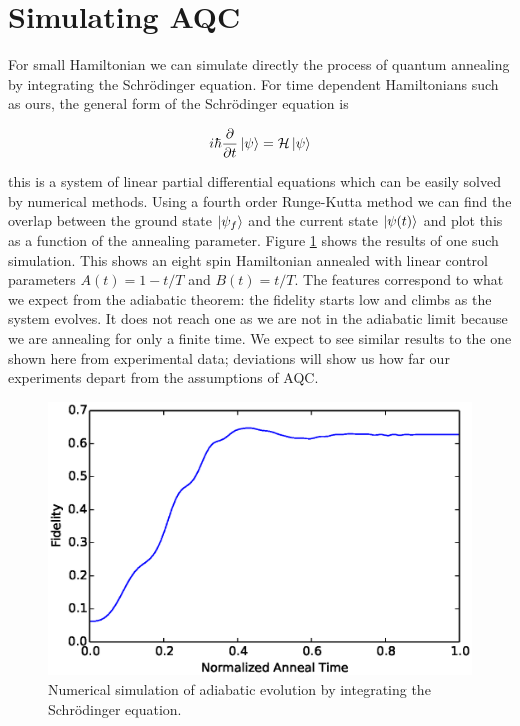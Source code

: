 \section{Simulating AQC}
For small Hamiltonian we can simulate directly the process of quantum annealing by integrating the Schr\"odinger equation. For time dependent Hamiltonians such as ours, the general form of the Schr\"odinger equation is 

\begin{equation}
	i\hbar\frac{\partial}{\partial t} \mathinner{|{\psi}\rangle} = \mathcal{H}\mathinner{|{\psi}\rangle}
\end{equation}

this is a system of linear partial differential equations which can be easily solved by numerical methods.  Using a fourth order Runge-Kutta method\cite{comp_book} we can find the overlap between the ground state $\mathinner{|{\psi_f}\rangle}$ and the current state $\mathinner{|{\psi(t)}\rangle}$ and plot this as a function of the annealing parameter.  Figure \ref{fig:simulate} shows the results of one such simulation.  This shows an eight spin Hamiltonian annealed with linear control parameters $A(t) = 1-t/T$ and $B(t) = t/T$.  The features correspond to what we expect from the adiabatic theorem: the fidelity starts low and climbs as the system evolves.  It does not reach one as we are not in the adiabatic limit because we are annealing for only a finite time.  We expect to see similar results to the one shown here from experimental data; deviations will show us how far our experiments depart from the assumptions of AQC.
\begin{figure}
	\includegraphics{img/simulate.eps}
	\caption[Simulated AQC]{Numerical simulation of adiabatic evolution by integrating the Schr\"odinger equation.}
	\label{fig:simulate}
\end{figure}
